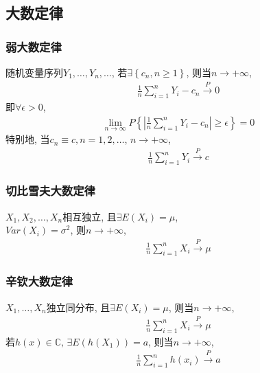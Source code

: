 \subsection{大数定律}
\subsubsection{弱大数定律}
\begin{theorem}
    随机变量序列$Y_1,\dots,Y_n,\dots$, 若$\exists \left\{c_n, n\ge 1\right\}$, 则当$n\rightarrow +\infty$,  
    \begin{align*}
        \frac{1}{n}\sum_{i=1}^n Y_i-c_n\overset{P}{\longrightarrow}0
    \end{align*}
    即$\forall \epsilon>0$, 
    \begin{align*}
        \lim_{n\rightarrow \infty}P\left\{ \left| \frac{1}{n}\sum_{i=1}^n Y_i-c_n \right|\ge \epsilon \right\}=0
    \end{align*}
    特别地, 当$c_n\equiv c, n=1,2,\dots$, $n\rightarrow +\infty$, 
    \begin{align*}
        \frac{1}{n}\sum_{i=1}^n Y_i\overset{P}{\longrightarrow}c
    \end{align*}
\end{theorem}

\subsubsection{切比雪夫大数定律}
\begin{theorem}
    $X_1,X_2,\dots,X_n$相互独立, 且$\exists E(X_i)=\mu$, \\$Var(X_i)=\sigma^2$, 则$n\rightarrow +\infty$, 
    \begin{align*}
        \frac{1}{n}\sum_{i=1}^n X_i \overset{P}{\longrightarrow} \mu
    \end{align*}
\end{theorem}

\subsubsection{辛钦大数定律}
\begin{theorem}
    $X_1,\dots, X_n$独立同分布, 且$\exists E(X_i)=\mu$, 则当$n\rightarrow +\infty$, 
    \begin{align*}
        \frac{1}{n}\sum_{i=1}^n X_i \overset{P}{\longrightarrow} \mu
    \end{align*}
    若$h(x)\in \mathbb{C}, \, \exists E(h(X_1))=a$, 则当$n\rightarrow +\infty$, 
    \begin{align*}
        \frac{1}{n}\sum_{i=1}^n h(x_i) \overset{P}{\longrightarrow} a
    \end{align*}
\end{theorem}

